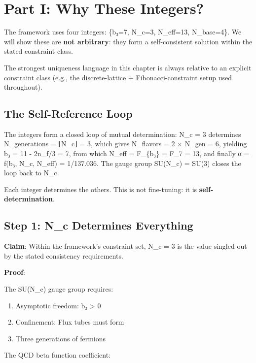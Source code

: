 \documentclass[
  11pt,
  letterpaper,
  twoside,
  openany]{book}
\makeatletter
\providecommand{\tightlist}{%
  \setlength{\itemsep}{0pt}\setlength{\parskip}{0pt}}
\let\orig@section\section
\renewcommand{\section}{\needspace{8\baselineskip}\orig@section}
\let\orig@subsection\subsection
\renewcommand{\subsection}{\needspace{6\baselineskip}\orig@subsection}
\makeatother
\begin{document}
\section{Part I: Why These Integers?}\label{part-i-why-these-integers}

The framework uses four integers: \{b₃=7, N\_c=3, N\_eff=13,
N\_base=4\}. We will show these are \textbf{not arbitrary}: they form a
self-consistent solution within the stated constraint class.

The strongest uniqueness language in this chapter is always relative to
an explicit constraint class (e.g., the discrete-lattice +
Fibonacci-constraint setup used throughout).

\subsection{The Self-Reference Loop}\label{the-self-reference-loop}

The integers form a closed loop of mutual determination: N\_c = 3
determines N\_generations = ⌊N\_c⌋ = 3, which gives N\_flavors = 2 ×
N\_gen = 6, yielding b₃ = 11 - 2n\_f/3 = 7, from which N\_eff =
F\_\{b₃\} = F\_7 = 13, and finally α = f(b₃, N\_c, N\_eff) = 1/137.036.
The gauge group SU(N\_c) = SU(3) closes the loop back to N\_c.

Each integer determines the others. This is not fine-tuning: it is
\textbf{self-determination}.

\subsection{Step 1: N\_c Determines
Everything}\label{step-1-n_c-determines-everything}

\textbf{Claim}: Within the framework's constraint set, N\_c = 3 is the
value singled out by the stated consistency requirements.

\textbf{Proof}:

The SU(N\_c) gauge group requires:

\begin{enumerate}
\def\labelenumi{\arabic{enumi}.}
\tightlist
\item
  Asymptotic freedom: b₃ \textgreater{} 0
\item
  Confinement: Flux tubes must form
\item
  Three generations of fermions
\end{enumerate}

The QCD beta function coefficient:
\end{document}

